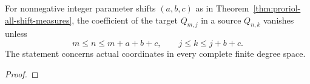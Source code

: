 \begin{theorem}
\label{thm:proriol-all-shift-support}
\leanok
For nonnegative integer parameter shifts $(a,b,c)$ as in Theorem~\ref{thm:proriol-all-shift-measures}, the coefficient of the target $Q_{m,j}$ in a source
$Q_{n,k}$ vanishes unless
\[
 m\le n\le m+a+b+c,\qquad j\le k\le j+b+c.
\]
The statement concerns actual coordinates in every complete finite degree space.
\end{theorem}
\begin{proof}
\leanok
\end{proof}

